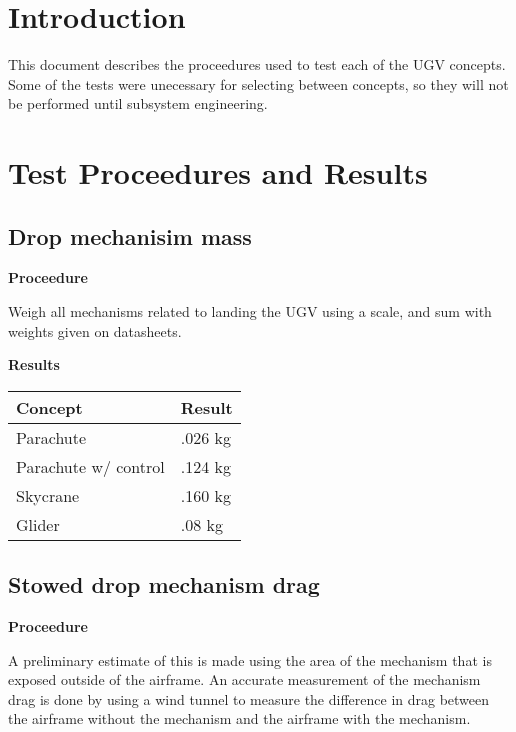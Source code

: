 \documentclass[]{auvsi_doc}
\begin{document}
\begin{AUVSITitlePage}
\begin{artifacttable}
\end{artifacttable}
\end{AUVSITitlePage}

\section{Introduction}
This document describes the proceedures used to test each of the UGV concepts.
Some of the tests were unecessary for selecting between concepts, so they will not be performed until subsystem engineering.

\section {Test Proceedures and Results}
	\subsection{Drop mechanisim mass}
	\textbf{Proceedure}

	Weigh all mechanisms related to landing the UGV using a scale, and sum with weights given on datasheets.

	\textbf{Results} 

	\begin{tabular}{|l|l|}
		\hline
		\textbf{Concept}       & \textbf{Result} \\
		\hline
		Parachute              & .026 kg                \\
		Parachute w/ control   & .124 kg                \\
		Skycrane               & .160 kg                \\
		Glider                 & .08 kg				 \\
		\hline
	\end{tabular}

	\subsection{Stowed drop mechanism drag}                                   
	\textbf{Proceedure}

	A preliminary estimate of this is made using the area of the mechanism that is exposed outside of the airframe. 
	An accurate measurement of the mechanism drag is done by using a wind tunnel to measure the difference in drag between the airframe without the mechanism and the airframe with the mechanism.
	
\end{document}
